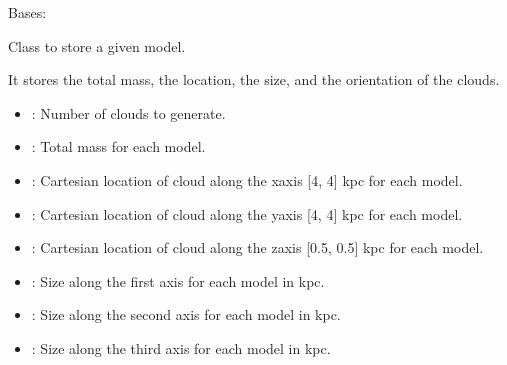 \documentclass[letterpaper,10pt,english]{sphinxmanual}
\begin{document}
\begin{fulllineitems}
\label{\detokenize{ExtinctionModel:ExtinctionModel.ExtinctionModel}}
\pysigstartsignatures
{}
\pysigstopsignatures
\sphinxAtStartPar
Bases: 

\sphinxAtStartPar
Class to store a given model.
\begin{description}
\sphinxAtStartPar
It stores the total mass, the location, the size, and the orientation of the clouds.

\begin{itemize}
\item {} 
\sphinxAtStartPar
{}: Number of clouds to generate.

\end{itemize}

\begin{itemize}
\item {} 
\sphinxAtStartPar
{}: Total mass for each model.

\item {} 
\sphinxAtStartPar
{}: Cartesian location of cloud along the x\sphinxhyphen{}axis {[}\sphinxhyphen{}4, 4{]} kpc for each model.

\item {} 
\sphinxAtStartPar
{}: Cartesian location of cloud along the y\sphinxhyphen{}axis {[}\sphinxhyphen{}4, 4{]} kpc for each model.

\item {} 
\sphinxAtStartPar
{}: Cartesian location of cloud along the z\sphinxhyphen{}axis {[}\sphinxhyphen{}0.5, 0.5{]} kpc for each model.

\item {} 
\sphinxAtStartPar
{}: Size along the first axis for each model in kpc.

\item {} 
\sphinxAtStartPar
{}: Size along the second axis for each model in kpc.

\item {} 
\sphinxAtStartPar
{}: Size along the third axis for each model in kpc.


\end{itemize}
\end{description}
\end{fulllineitems}
\end{document}
